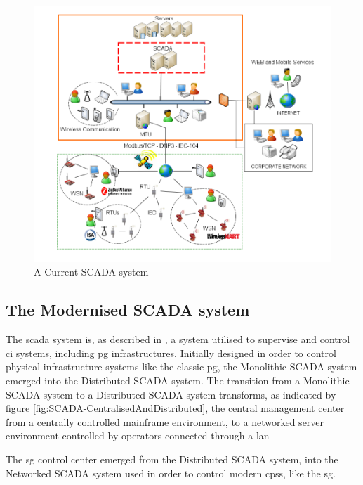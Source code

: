  \begin{figure}[ht]
\centering
    \includegraphics[trim=20 20 20 10, clip, width=\textwidth]{figures/SCADA-Current.png}
\caption[A Current SCADA system]{A Current SCADA system \cite[p. 124]{alcaraz2012security}}

\end{figure}





\subsection{The Modernised SCADA system}
 
 The \acrshort{scada} system is, as described in \cite{alcaraz2012security}, a system utilised to supervise and control \acrfull{ci} systems, including \acrshort{pg} infrastructures. Initially designed in order to control physical infrastructure systems like the classic \acrlong{pg}, the Monolithic SCADA system emerged into the Distributed SCADA system. The transition from a Monolithic SCADA system to a Distributed SCADA system transforms, as indicated by figure \ref{fig:SCADA-CentralisedAndDistributed}, the central management center from a centrally controlled mainframe environment, to a networked server environment controlled by operators connected through a \acrfull{lan}
  
  
 The \acrshort{sg} control center emerged from the Distributed SCADA system, into the Networked SCADA system used in order to control modern \acrlong{cps}s, like the \acrshort{sg}.\\ 
 



